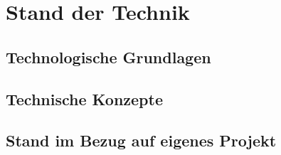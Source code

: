 \chapter{Stand der Technik}
\label{ch:StandDerTechnik}


\section{Technologische Grundlagen}

\section{Technische Konzepte}
\label{sec:technischeKonzepte}

\section{Stand im Bezug auf eigenes Projekt}
